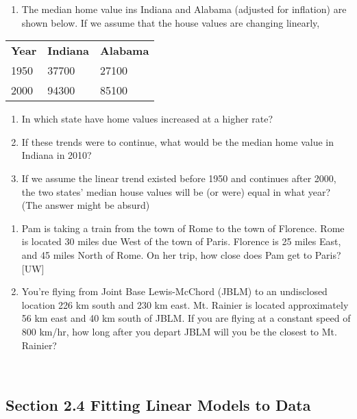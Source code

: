 \begin{enumerate}
\begin{enumerate}
\def\labelenumi{\arabic{enumi}.}
\item
  The median home value ins Indiana and Alabama (adjusted for inflation)
  are shown below. If we assume that the house values are changing
  linearly,
\end{enumerate}

\begin{longtable}[]{@{}lll@{}}
\toprule
\textbf{Year} & \textbf{Indiana} & \textbf{Alabama}\tabularnewline
1950 & 37700 & 27100\tabularnewline
2000 & 94300 & 85100\tabularnewline
\bottomrule
\end{longtable}

\begin{enumerate}
\def\labelenumi{\alph{enumi}.}
\item
  In which state have home values increased at a higher rate?
\item
  If these trends were to continue, what would be the median home value
  in Indiana in 2010?
\item
  If we assume the linear trend existed before 1950 and continues after
  2000, the two states' median house values will be (or were) equal in
  what year? (The answer might be absurd)
\end{enumerate}

\begin{enumerate}
\def\labelenumi{\arabic{enumi}.}
\item
  Pam is taking a train from the town of Rome to the town of Florence.
  Rome is located 30 miles due West of the town of Paris. Florence is 25
  miles East, and 45 miles North of Rome. On her trip, how close does
  Pam get to Paris? {[}UW{]}
\item
  You're flying from Joint Base Lewis-McChord (JBLM) to an undisclosed
  location 226 km south and 230 km east. Mt. Rainier is located
  approximately 56 km east and 40 km south of JBLM. If you are flying at
  a constant speed of 800 km/hr, how long after you depart JBLM will you
  be the closest to Mt. Rainier?
\end{enumerate}

~

\hypertarget{section-2.4-fitting-linear-models-to-data}{\subsection{Section
2.4 Fitting Linear Models to
Data}\label{section-2.4-fitting-linear-models-to-data}}


\end{enumerate}
